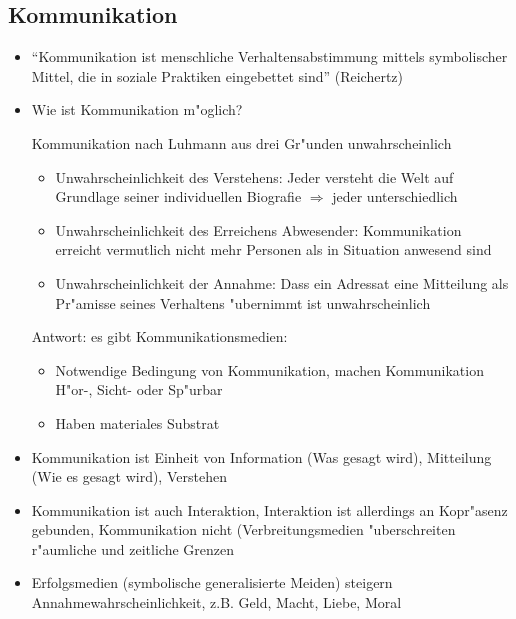 \subsection{Kommunikation}
\begin{itemize}
	\item
		\enquote{Kommunikation ist menschliche Verhaltensabstimmung mittels symbolischer Mittel, die in soziale Praktiken eingebettet sind} (Reichertz)
	\item
		Wie ist Kommunikation m"oglich?

		Kommunikation nach Luhmann aus drei Gr"unden unwahrscheinlich
		\begin{itemize}
			\item
				Unwahrscheinlichkeit des Verstehens: Jeder versteht die Welt auf Grundlage seiner individuellen Biografie $\Rightarrow$ jeder unterschiedlich
			\item
				Unwahrscheinlichkeit des Erreichens Abwesender: Kommunikation erreicht vermutlich nicht mehr Personen als in Situation anwesend sind
			\item
				Unwahrscheinlichkeit der Annahme: Dass ein Adressat eine Mitteilung als Pr"amisse seines Verhaltens "ubernimmt ist unwahrscheinlich
		\end{itemize}

		Antwort: es gibt Kommunikationsmedien:
		\begin{itemize}
			\item
				Notwendige Bedingung von Kommunikation, machen Kommunikation H"or-, Sicht- oder Sp"urbar
			\item
				Haben materiales Substrat
		\end{itemize}
	\item
		Kommunikation ist Einheit von Information (Was gesagt wird), Mitteilung (Wie es gesagt wird), Verstehen
	\item
		Kommunikation ist auch Interaktion, Interaktion ist allerdings an Kopr"asenz gebunden, Kommunikation nicht (Verbreitungsmedien "uberschreiten r"aumliche und zeitliche Grenzen
	\item
		Erfolgsmedien (symbolische generalisierte Meiden) steigern Annahmewahrscheinlichkeit, z.B. Geld, Macht, Liebe, Moral
\end{itemize}
